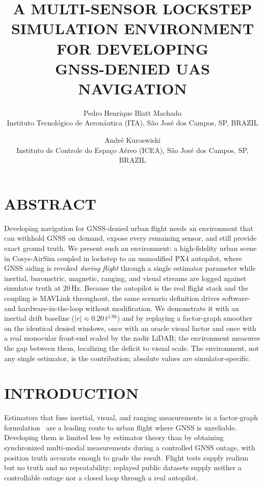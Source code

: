 \documentclass{wscposterproc}
\begin{document}

\title{A MULTI-SENSOR LOCKSTEP SIMULATION ENVIRONMENT FOR DEVELOPING\\
GNSS-DENIED UAS NAVIGATION}

\author{
Pedro Henrique Blatt Machado\\[2pt]
Instituto Tecnol\'ogico de Aeron\'autica (ITA), S\~ao Jos\'e dos Campos, SP, BRAZIL\\
\and
Andr\'e Kuroswiski\\[2pt]
Instituto de Controle do Espa\c{c}o A\'ereo (ICEA), S\~ao Jos\'e dos Campos, SP, BRAZIL\\
}

\maketitle

\section*{ABSTRACT}
Developing navigation for GNSS-denied urban flight needs an environment that can
withhold GNSS on demand, expose every remaining sensor, and still provide exact
ground truth.
We present such an environment: a high-fidelity urban scene in Cosys-AirSim coupled
in lockstep to an unmodified PX4 autopilot, where GNSS aiding is revoked
\emph{during flight} through a single estimator parameter while inertial,
barometric, magnetic, ranging, and visual streams are logged against simulator
truth at $20$\,Hz.
Because the autopilot is the real flight stack and the coupling is MAVLink
throughout, the same scenario definition drives software- and hardware-in-the-loop
without modification.
We demonstrate it with an inertial drift baseline
($|e| \approx 0.20\,t^{1.96}$) and by replaying a factor-graph smoother on the
identical denied windows, once with an oracle visual factor and once with a real
monocular front-end scaled by the nadir LiDAR; the environment measures the gap
between them, localizing the deficit to visual scale.
The environment, not any single estimator, is the contribution; absolute values
are simulator-specific.

\section{INTRODUCTION}
\label{sec:intro}
Estimators that fuse inertial, visual, and ranging measurements in a factor-graph
formulation~\cite{dellaert2017factor} are a leading route to urban flight where
GNSS is unreliable.
Developing them is limited less by estimator theory than by obtaining synchronized
multi-modal measurements during a controlled GNSS outage, with position truth
accurate enough to grade the result.
Flight tests supply realism but no truth and no repeatability; replayed public
datasets supply neither a controllable outage nor a closed loop through a real
autopilot.
\end{document}

